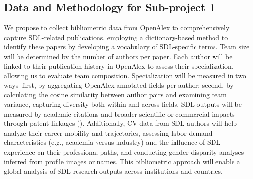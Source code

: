 \documentclass{article}
\begin{document}
\subsection{Data and Methodology for Sub-project 1}
We propose to collect bibliometric data from OpenAlex to comprehensively capture SDL-related publications, employing a dictionary-based method to identify these papers by developing a vocabulary of SDL-specific terms. Team size will be determined by the number of authors per paper. Each author will be linked to their publication history in OpenAlex to assess their specialization, allowing us to evaluate team composition. Specialization will be measured in two ways: first, by aggregating OpenAlex-annotated fields per author; second, by calculating the cosine similarity between author pairs and examining team variance, capturing diversity both within and across fields. SDL outputs will be measured by academic citations and broader scientific or commercial impacts through patent linkages (\cite{marx2020reliance}). Additionally, CV data from SDL authors will help analyze their career mobility and trajectories, assessing labor demand characteristics (e.g., academia versus industry) and the influence of SDL experience on their professional paths, and conducting gender disparity analyses inferred from profile images or names. This bibliometric approach will enable a global analysis of SDL research outputs across institutions and countries.

\end{document}

